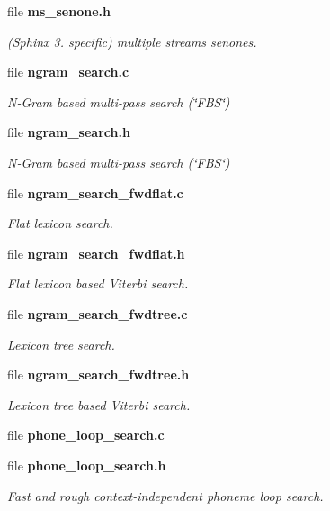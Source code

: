 \begin{DoxyCompactItemize}
\item 
file {\bf ms\-\_\-senone.\-h}
\begin{DoxyCompactList}\small\item\em (Sphinx 3. specific) multiple streams senones. \end{DoxyCompactList}\item 
file {\bf ngram\-\_\-search.\-c}
\begin{DoxyCompactList}\small\item\em N-\/\-Gram based multi-\/pass search (\char`\"{}\-F\-B\-S\char`\"{}) \end{DoxyCompactList}\item 
file {\bf ngram\-\_\-search.\-h}
\begin{DoxyCompactList}\small\item\em N-\/\-Gram based multi-\/pass search (\char`\"{}\-F\-B\-S\char`\"{}) \end{DoxyCompactList}\item 
file {\bf ngram\-\_\-search\-\_\-fwdflat.\-c}
\begin{DoxyCompactList}\small\item\em Flat lexicon search. \end{DoxyCompactList}\item 
file {\bf ngram\-\_\-search\-\_\-fwdflat.\-h}
\begin{DoxyCompactList}\small\item\em Flat lexicon based Viterbi search. \end{DoxyCompactList}\item 
file {\bf ngram\-\_\-search\-\_\-fwdtree.\-c}
\begin{DoxyCompactList}\small\item\em Lexicon tree search. \end{DoxyCompactList}\item 
file {\bf ngram\-\_\-search\-\_\-fwdtree.\-h}
\begin{DoxyCompactList}\small\item\em Lexicon tree based Viterbi search. \end{DoxyCompactList}\item 
file {\bfseries phone\-\_\-loop\-\_\-search.\-c}
\item 
file {\bf phone\-\_\-loop\-\_\-search.\-h}
\begin{DoxyCompactList}\small\item\em Fast and rough context-\/independent phoneme loop search. \end{DoxyCompactList}\item 

\end{DoxyCompactItemize}
